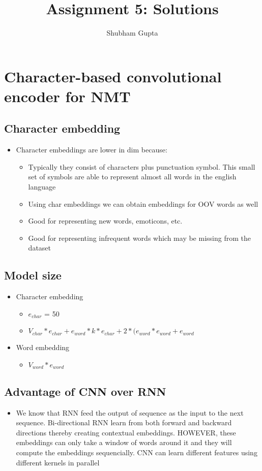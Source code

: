 \documentclass[a4paper]{article}
\title{Assignment 5: Solutions}
\author{Shubham Gupta}
\begin{document}
\maketitle
\section{Character-based convolutional encoder for NMT}
\subsection{Character embedding}
\begin{itemize}
    \item Character embeddings are lower in dim because:
    \begin{itemize}
        \item Typically they consist of characters plus punctuation symbol. This small set of symbols are able to represent almost all words in the english language
        \item Using char embeddings we can obtain embeddings for OOV words as well
        \item Good for representing new words, emoticons, etc.
        \item Good for representing infrequent words which may be missing from the dataset
    \end{itemize}
\end{itemize}
\subsection{Model size}
\begin{itemize}
    \item Character embedding
    \begin{itemize}
        \item $e_{char}$ = 50
        \item $V_{char} * e_{char} + e_{word} * k * e_{char} + 2 * (e_{word} * e_{word} + e_{word}$
    \end{itemize}
    \item Word embedding
    \begin{itemize}
        \item $V_{word} * e_{word}$
    \end{itemize}
\end{itemize}
\subsection{Advantage of CNN over RNN}
\begin{itemize}
    \item We know that RNN feed the output of sequence as the input to the next sequence. Bi-directional RNN learn from both forward and backward directions thereby creating contextual embeddings. HOWEVER, these embeddings can only take a window of words around it and they will compute the embeddings sequencially. CNN can learn different features using different kernels in parallel
\end{itemize}
\end{document}
